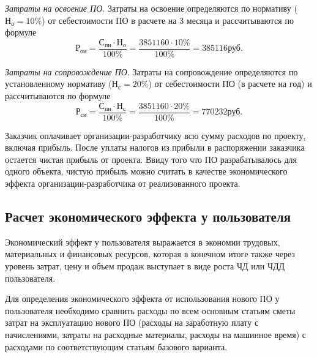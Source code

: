 \emph{Затраты на освоение ПО}. Затраты на освоение определяются по нормативу (\( \text{Н}_{\text{о}} = 10\% \)) от себестоимости ПО в расчете на 3 месяца и рассчитываются по формуле
\begin{displaymath}
  \text{Р}_{\text{ои}} = \frac{\text{С}_{\text{пи}} \cdot \text{Н}_{\text{о}}}{100\%} = \frac{3851160 \cdot 10\%}{100\%} = 385116 \text{руб}.
\end{displaymath}

\emph{Затраты на сопровождение ПО}. Затраты на сопровождение определяются по установленному нормативу (\( \text{Н}_{\text{с}} = 20\% \)) от себестоимости ПО (в расчете на год) и рассчитываются по формуле
\begin{displaymath}
  \text{Р}_{\text{си}} = \frac{\text{С}_{\text{пи}} \cdot \text{Н}_{\text{с}}}{100\%} = \frac{3851160 \cdot 20\%}{100\%} = 770232 \text{руб}.
\end{displaymath}

Заказчик оплачивает организации-разработчику всю сумму расходов по проекту, включая прибыль. После уплаты налогов из прибыли в распоряжении заказчика остается чистая прибыль от проекта. Ввиду того что ПО разрабатывалось для одного объекта, чистую прибыль можно считать в качестве экономического эффекта организации-разработчика от реализованного проекта.

\subsection{Расчет экономического эффекта у пользователя}
Экономический эффект у пользователя выражается в экономии трудовых, материальных и финансовых ресурсов, которая в конечном итоге также через уровень затрат, цену и объем продаж выступает в виде роста ЧД или ЧДД пользователя.

Для определения экономического эффекта от использования нового ПО у пользователя необходимо сравнить расходы по всем основным статьям сметы затрат на эксплуатацию нового ПО (расходы на заработную плату с начислениями, затраты на расходные материалы, расходы на машинное время) с расходами по соответствующим статьям базового варианта.

